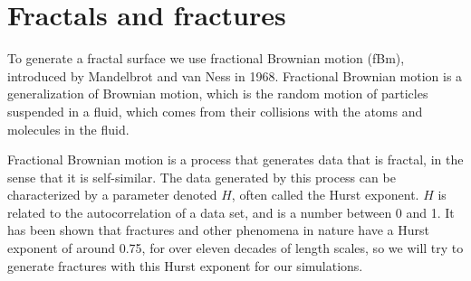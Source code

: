 \chapter{Fractals and fractures}
%
%
To generate a fractal surface we use fractional Brownian motion (fBm), introduced by Mandelbrot and van Ness in 1968\cite{mandelbrot1968fractional}. Fractional Brownian motion is a generalization of Brownian motion, which is the random motion of particles suspended in a fluid, which comes from their collisions with the atoms and molecules in the fluid. 

Fractional Brownian motion is a process that generates data that is fractal, in the sense that it is self-similar. The data generated by this process can be characterized by a parameter denoted $H$, often called the Hurst exponent. $H$ is related to the autocorrelation of a data set, and is a number between 0 and 1. It has been shown that fractures and other phenomena in nature have a Hurst exponent of around 0.75, for over eleven decades of length scales\cite{renard2013hurst}, so we will try to generate fractures with this Hurst exponent for our simulations.



